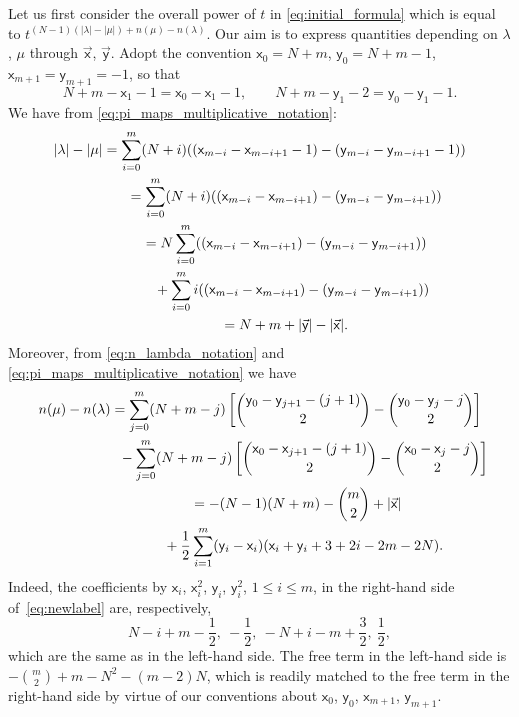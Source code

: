 \documentclass[pdftex]{sigma}
\numberwithin{equation}{section}
\begin{document}
Let us first consider the overall power of $t$
in \eqref{eq:initial_formula}
which is equal to
$t^{(N-1)(|\lambda|-|\mu|)+n(\mu)-n(\lambda)}$.
Our aim is to express quantities
depending on $\lambda$, $\mu$ through
$\vec{\mathsf{x}}$, $\vec{\mathsf{y}}$.
Adopt the convention
$\mathsf{x}_0=N+m$,
$\mathsf{y}_0=N+m-1$,
$\mathsf{x}_{m+1}=\mathsf{y}_{m+1}=-1$,
so that
\begin{equation*}
	N+m-\mathsf{x}_1-1=\mathsf{x}_0-\mathsf{x}_1-1,\qquad
	N+m-\mathsf{y}_1-2=\mathsf{y}_0-\mathsf{y}_1-1.
\end{equation*}
We have from \eqref{eq:pi_maps_multiplicative_notation}:
\begin{gather*}
	|\lambda|-|\mu|	=
	\sum_{i=0}^{m}
	(N+i)
	(
	( \mathsf{x}_{m-i}-\mathsf{x}_{m-i+1}-1 )-
	( \mathsf{y}_{m-i}-\mathsf{y}_{m-i+1}-1)
)
	\\
\hphantom{|\lambda|-|\mu|}{}
=
	\sum_{i=0}^{m}
	(N+i)
	(
	( \mathsf{x}_{m-i}-\mathsf{x}_{m-i+1} )-
	( \mathsf{y}_{m-i}-\mathsf{y}_{m-i+1} )
)
	\\
\hphantom{|\lambda|-|\mu|}{}
=
	N\sum_{i=0}^{m}
	(
	( \mathsf{x}_{m-i}-\mathsf{x}_{m-i+1} )-
	( \mathsf{y}_{m-i}-\mathsf{y}_{m-i+1} )
	)\\
\hphantom{|\lambda|-|\mu|=}{}
	+
	\sum_{i=0}^{m}i
	(
	( \mathsf{x}_{m-i}-\mathsf{x}_{m-i+1} )-
	( \mathsf{y}_{m-i}-\mathsf{y}_{m-i+1})
	)
	\\
\hphantom{|\lambda|-|\mu|}{}
=
	N+m+
	|\vec {\mathsf{y}}|-|\vec{\mathsf{x}}|.
\end{gather*}
Moreover, from
\eqref{eq:n_lambda_notation} and \eqref{eq:pi_maps_multiplicative_notation}
we have
\begin{gather}
	\nonumber
	n(\mu)-n(\lambda)
	=
	\sum_{j=0}^{m}
	(N+m-j)
	\left[
		\binom{\mathsf{y}_0-\mathsf{y}_{j+1}-(j+1)}2-
		\binom{\mathsf{y}_0-\mathsf{y}_{j}-j}2
	\right]
	\\
\hphantom{n(\mu)-n(\lambda)=}{}
-
	\sum_{j=0}^{m}
	(N+m-j)
	\left[
		\binom{\mathsf{x}_0-\mathsf{x}_{j+1}-(j+1)}2-
		\binom{\mathsf{x}_0-\mathsf{x}_{j}-j}2
	\right]
\nonumber\\
\hphantom{n(\mu)-n(\lambda)}{}
=
	-(N-1)(N+m)
	-\binom{m}{2}
	+|\vec{\mathsf{x}}|\nonumber\\
\hphantom{n(\mu)-n(\lambda)=}{}
+
	\frac12
	\sum_{i=1}^{m}
	(\mathsf{y}_i-\mathsf{x}_i)(\mathsf{x}_i+\mathsf{y}_i+3+2i-2m-2N).
\label{eq:newlabel}
\end{gather}
Indeed, the coefficients
by $\mathsf{x}_i$, $\mathsf{x}_i^2$, $\mathsf{y}_i$, $\mathsf{y}_i^2$, $1\le i\le m$, in the right-hand side of~\eqref{eq:newlabel}
are, respectively,
\begin{equation*}
	N - i + m - \frac{1}{2}
	,\
	-\frac{1}{2}
	,\
	-N + i - m + \frac32
	,\
	\frac{1}{2},
\end{equation*}
which are the same as in the left-hand side.
The free term in the left-hand side is
$-\binom m2+m-N^2-(m-2)N$,
which is readily matched to the free term in the
right-hand side by virtue of
our conventions about
$\mathsf{x}_0$, $\mathsf{y}_0$, $\mathsf{x}_{m+1}$, $\mathsf{y}_{m+1}$.
\end{document}
